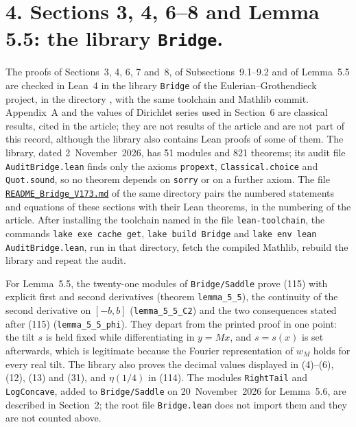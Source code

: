 \documentclass[11pt,a4paper]{article}
\newcommand{\R}{https://github.com/ralfanop/Certifications_Eulerian_polar-curve_computations}
\newcommand{\dir}[1]{\href{\R/tree/main/#1}{\texttt{\detokenize{#1}}}}
\newcommand{\eq}[1]{(#1)}
\begin{document}
\section*{4. Sections 3, 4, 6--8 and Lemma 5.5: the library \texttt{Bridge}.}
The proofs of Sections~3, 4, 6, 7 and~8, of Subsections~9.1--9.2 and of Lemma~5.5 are checked in Lean~4 in the library \texttt{Bridge} of the Eulerian--Grothendieck project, in the directory \dir{lean/EulerianGrothendieck}, with the same toolchain and Mathlib commit. Appendix~A and the values of Dirichlet series used in Section~6 are classical results, cited in the article; they are not results of the article and are not part of this record, although the library also contains Lean proofs of some of them. The library, dated 2~November~2026, has 51 modules and 821 theorems; its audit file \texttt{AuditBridge.lean} finds only the axioms \texttt{propext}, \texttt{Classical.choice} and \texttt{Quot.sound}, so no theorem depends on \texttt{sorry} or on a further axiom. The file \href{\R/blob/main/lean/EulerianGrothendieck/README_Bridge_V173.md}{\texttt{README\_Bridge\_V173.md}} of the same directory pairs the numbered statements and equations of these sections with their Lean theorems, in the numbering of the article. After installing the toolchain named in the file \texttt{lean-toolchain}, the commands \texttt{lake exe cache get}, \texttt{lake build Bridge} and \texttt{lake env lean AuditBridge.lean}, run in that directory, fetch the compiled Mathlib, rebuild the library and repeat the audit.

For Lemma~5.5, the twenty-one modules of \texttt{Bridge/Saddle} prove \eq{115} with explicit first and second derivatives (theorem \texttt{lemma\_5\_5}), the continuity of the second derivative on $[-b,b]$ (\texttt{lemma\_5\_5\_C2}) and the two consequences stated after \eq{115} (\texttt{lemma\_5\_5\_phi}). They depart from the printed proof in one point: the tilt $s$ is held fixed while differentiating in $y=Mx$, and $s=s(x)$ is set afterwards, which is legitimate because the Fourier representation of $w_M$ holds for every real tilt. The library also proves the decimal values displayed in \eq{4}--\eq{6}, \eq{12}, \eq{13} and \eq{31}, and $\eta(1/4)$ in \eq{114}. The modules \texttt{RightTail} and \texttt{LogConcave}, added to \texttt{Bridge/Saddle} on 20~November~2026 for Lemma~5.6, are described in Section~2; the root file \texttt{Bridge.lean} does not import them and they are not counted above.
\end{document}
